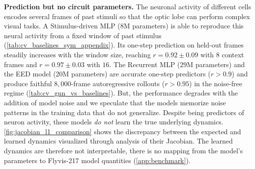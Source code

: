 \documentclass{article}
\def\stimbase{Stimulus-driven MLP}
\def\eedbase{EED model}
\def\mlpbase{Recurrent MLP}
\begin{document}


\textbf{Prediction but no circuit parameters.}
The neuronal activity of different cells encodes several frames of past
stimuli so that the optic lobe can perform complex visual tasks. A
\stimbase{} ($8$M parameters) is able to reproduce this neural activity from a fixed window of past stimulus (\cref{tab:cv_baselines_sym_appendix}). Its one-step prediction on held-out frames
steadily increases with the window size, reaching $r = 0.92 \pm 0.09$
with $8$ context frames and $r = 0.97 \pm 0.03$ with $16$.
The \mlpbase{} ($29$M parameters) and the \eedbase{} ($20$M parameters) are
accurate one-step predictors ($r > 0.9$) and produce
faithful $8{,}000$-frame autoregressive rollouts ($r > 0.95$) in the noise-free
regime (\cref{tab:cv_gnn_vs_baselines}). But, the performance degrades with the addition of model noise and we speculate that the models memorize noise patterns in the training data that do not generalize. Despite being predictors of neuron activity, these models \emph{do not} learn the true underlying dynamics. \cref{fig:jacobian_l1_comparison} shows the discrepancy between the expected and learned dynamics visualized through analysis of their Jacobian. 
The learned dynamics are therefore not interpretable, there is no
mapping from the model's parameters to Flyvis-217 model quantities (\cref{app:benchmark}).
\end{document}
